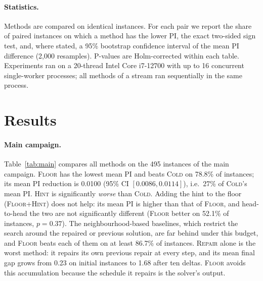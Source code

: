 \documentclass[letterpaper]{article} %
\newcommand{\mcold}{\textsc{Cold}}
\newcommand{\mhint}{\textsc{Hint}}
\newcommand{\mfloor}{\textsc{Floor}}
\newcommand{\mfh}{\textsc{Floor+Hint}}
\newcommand{\mrep}{\textsc{Repair}}
\begin{document}
\paragraph{Statistics.} Methods are compared on identical instances. For each pair we report the share of paired instances on which a method has the lower PI, the exact two-sided sign test, and, where stated, a 95\% bootstrap confidence interval of the mean PI difference (2{,}000 resamples). P-values are Holm-corrected within each table. Experiments ran on a 20-thread Intel Core i7-12700 with up to 16 concurrent single-worker processes; all methods of a stream ran sequentially in the same process.

\section{Results}

\paragraph{Main campaign.} Table~\ref{tab:main} compares all methods on the 495 instances of the main campaign. \mfloor{} has the lowest mean PI and beats \mcold{} on 78.8\% of instances; its mean PI reduction is 0.0100 (95\% CI $[0.0086, 0.0114]$), i.e.\ 27\% of \mcold's mean PI. \mhint{} is significantly \emph{worse} than \mcold. Adding the hint to the floor (\mfh) does not help: its mean PI is higher than that of \mfloor, and head-to-head the two are not significantly different (\mfloor{} better on 52.1\% of instances, $p=0.37$). The neighbourhood-based baselines, which restrict the search around the repaired or previous solution, are far behind under this budget, and \mfloor{} beats each of them on at least 86.7\% of instances. \mrep{} alone is the worst method: it repairs its own previous repair at every step, and its mean final gap grows from 0.23 on initial instances to 1.68 after ten deltas. \mfloor{} avoids this accumulation because the schedule it repairs is the solver's output.
\end{document}
